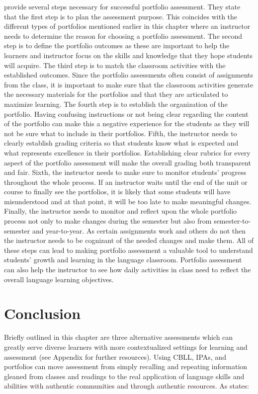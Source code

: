 \documentclass[output=paper]{langscibook}
\begin{document}
\citet{DelettKevorkian2001} provide several steps necessary for successful portfolio assessment. They state that the first step is to plan the assessment purpose. This coincides with the different types of portfolios mentioned earlier in this chapter where an instructor needs to determine the reason for choosing a portfolio assessment. The second step is to define the portfolio outcomes as these are important to help the learners and instructor focus on the skills and knowledge that they hope students will acquire. The third step is to match the classroom activities with the established outcomes. Since the portfolio assessments often consist of assignments from the class, it is important to make sure that the classroom activities generate the necessary materials for the portfolios and that they are articulated to maximize learning. The fourth step is to establish the organization of the portfolio. Having confusing instructions or not being clear regarding the content of the portfolio can make this a negative experience for the students as they will not be sure what to include in their portfolios. Fifth, the instructor needs to clearly establish grading criteria so that students know what is expected and what represents excellence in their portfolios. Establishing clear rubrics for every aspect of the portfolio assessment will make the overall grading both transparent and fair. Sixth, the instructor needs to make sure to monitor students’ progress throughout the whole process. If an instructor waits until the end of the unit or course to finally see the portfolios, it is likely that some students will have misunderstood and at that point, it will be too late to make meaningful changes. Finally, the instructor needs to monitor and reflect upon the whole portfolio process not only to make changes during the semester but also from semester-to-semester and year-to-year. As certain assignments work and others do not then the instructor needs to be cognizant of the needed changes and make them. All of these steps can lead to making portfolio assessment a valuable tool to understand students’ growth and learning in the language classroom. Portfolio assessment can also help the instructor to see how daily activities in class need to reflect the overall language learning objectives.

\section{Conclusion}

\begin{sloppypar}
  Briefly outlined in this chapter are three alternative assessments which can greatly serve diverse learners with more contextualized settings for learning and assessment (see Appendix for further resources). Using CBLL, IPAs, and portfolios can move assessment from simply recalling and repeating information gleaned from classes and readings to the real application of language skills and abilities with authentic communities and through authentic resources. As \citet{Kunschak2020} states:
\end{sloppypar}
\end{document}
